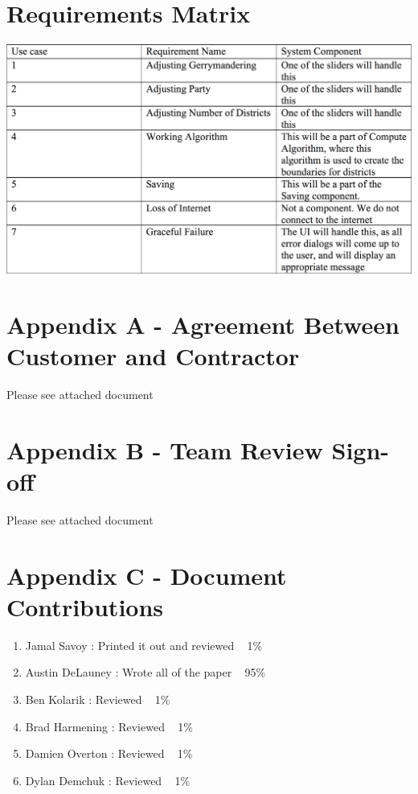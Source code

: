 \documentclass{article}
\begin{document}
\section{Requirements Matrix}
\vspace{2.5mm}
\begin{center}
\includegraphics[scale=.11]{Requirements.png}
\end{center}
\vspace{2.5mm}

\section{Appendix A - Agreement Between Customer and Contractor}
Please see attached document
\section{Appendix B - Team Review Sign-off}
Please see attached document
\section{Appendix C - Document Contributions}

\vspace{2.5mm}

\begin{addmargin}[2em]{0em}
\begin{enumerate}

\item Jamal Savoy : Printed it out and reviewed ~ 1\%

\item Austin DeLauney : Wrote all of the paper ~ 95\%

\item Ben Kolarik : Reviewed ~ 1\%

\item Brad Harmening : Reviewed ~ 1\%

\item Damien Overton : Reviewed ~ 1\%

\item Dylan Demchuk : Reviewed ~ 1\%

\end{enumerate}
\end{addmargin}
\end{document}
